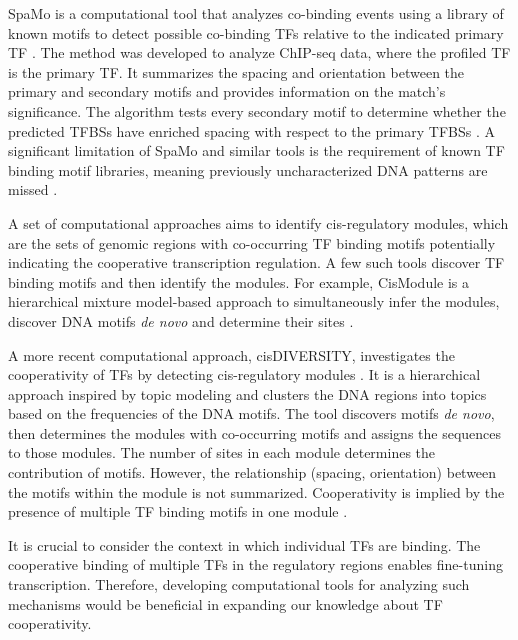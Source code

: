     SpaMo is a computational tool that analyzes co-binding events using a library of known motifs to detect possible co-binding TFs relative to the indicated primary TF \cite{whitington2011inferring}. The method was developed to analyze ChIP-seq data, where the profiled TF is the primary TF. It summarizes the spacing and orientation between the primary and secondary motifs and provides information on the match's significance. The algorithm tests every secondary motif to determine whether the predicted TFBSs have enriched spacing with respect to the primary TFBSs \cite{whitington2011inferring}. A significant limitation of SpaMo and similar tools is the requirement of known TF binding motif libraries, meaning previously uncharacterized DNA patterns are missed \cite{whitington2011inferring,levitsky2019single}.

    A set of computational approaches aims to identify cis-regulatory modules, which are the sets of genomic regions with co-occurring TF binding motifs potentially indicating the cooperative transcription regulation. A few such tools discover TF binding motifs and then identify the modules. For example, CisModule is a hierarchical mixture model-based approach to simultaneously infer the modules, discover DNA motifs \textit{de novo} and determine their sites \cite{zhou2004cismodule}.

    A more recent computational approach, cisDIVERSITY, investigates the cooperativity of TFs by detecting cis-regulatory modules \cite{biswas2021universal}. It is a hierarchical approach inspired by topic modeling and clusters the DNA regions into topics based on the frequencies of the DNA motifs. The tool discovers motifs \textit{de novo}, then determines the modules with co-occurring motifs and assigns the sequences to those modules. The number of sites in each module determines the contribution of motifs. However, the relationship (spacing, orientation) between the motifs within the module is not summarized. Cooperativity is implied by the presence of multiple TF binding motifs in one module \cite{biswas2021universal}.

    It is crucial to consider the context in which individual TFs are binding. The cooperative binding of multiple TFs in the regulatory regions enables fine-tuning transcription. Therefore, developing computational tools for analyzing such mechanisms would be beneficial in expanding our knowledge about TF cooperativity.

